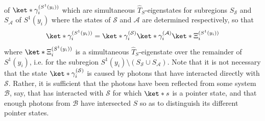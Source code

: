\documentclass[12pt]{report}
\providecommand{\DIFaddbegin}{} %
\providecommand{\DIFaddend}{} %
\providecommand{\DIFdelbegin}{} %
\providecommand{\DIFdelend}{} %
\begin{document}
 of $\ket*{\gamma^{(S^1(y_i))}_i}$ %
 \DIFdelbegin %
 \DIFdelend which are simultaneous $\hat{T}_S$-eigenstates for subregions $S_{\mathcal{S}}$ and $S_{\mathcal{A}}$ %
  of $S^1(y_i)$ where the states of $\mathcal{S}$ and $\mathcal{A}$ are determined respectively, so that 
\begin{equation}\label{gammadecomp}
\ket*{\gamma^{(S^1(y_i))}_i}=\ket*{\gamma^{(\mathcal{S})}_i}\ket*{\gamma^{(\mathcal{A})}_i}\ket*{\Xi^{(S^1(y_i))}_i}
\end{equation}
where $\ket*{\Xi^{(S^1(y_i))}_i}$ is a simultaneous $\hat{T}_S$-eigenstate over the remainder of $S^1(y_i)$, i.e. for the subregion $S^1(y_i)\setminus(S_{\mathcal{S}}\cup S_{\mathcal{A}})$.
%
\DIFdelbegin %
\DIFdelend \DIFaddbegin {}\DIFaddend %
 Note that it is not necessary that the state $\ket*{\gamma^{(\mathcal{S})}_i}$ is caused by photons that have interacted directly with $\mathcal{S}$. Rather, it is sufficient that the photons have been reflected from some system $\mathcal{B}$, say, that has interacted with $\mathcal{S}$ for which $\ket*{s}$ is a pointer state, and that enough photons from $\mathcal{B}$ have intersected $S$ so as to distinguish its different pointer states. 
\end{document}

